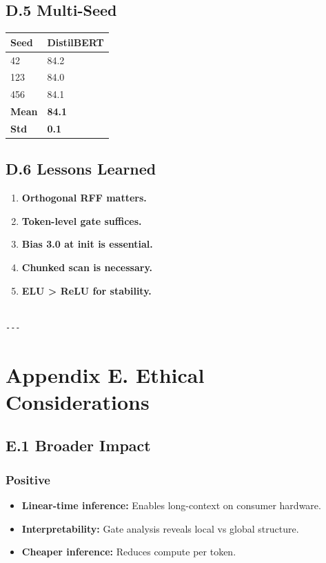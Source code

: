 \subsection{D.5 Multi-Seed}

\begin{table}[H]
\centering
\small
\begin{tabular}{ll}
\toprule
\textbf{Seed} & \textbf{DistilBERT} \\
\midrule
42 & 84.2 \\
123 & 84.0 \\
456 & 84.1 \\
\textbf{Mean} & \textbf{84.1} \\
\textbf{Std} & \textbf{0.1} \\
\bottomrule
\end{tabular}
\end{table}

\subsection{D.6 Lessons Learned}

\begin{enumerate}
\item \textbf{Orthogonal RFF matters.}
\item \textbf{Token-level gate suffices.}
\item \textbf{Bias 3.0 at init is essential.}
\item \textbf{Chunked scan is necessary.}
\item \textbf{ELU \textgreater{} ReLU for stability.}
\end{enumerate}
\begin{lstlisting}

---
\end{lstlisting}


\section{Appendix E. Ethical Considerations}

\subsection{E.1 Broader Impact}

\subsubsection{Positive}
\begin{itemize}
\item \textbf{Linear-time inference:} Enables long-context on consumer hardware.
\item \textbf{Interpretability:} Gate analysis reveals local vs global structure.
\item \textbf{Cheaper inference:} Reduces compute per token.

\end{itemize}
